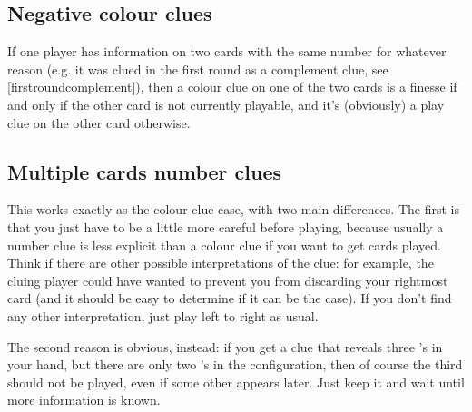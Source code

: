 \documentclass[a4paper]{article}
\theoremstyle{plain}
\theoremstyle{definition}
\begin{document}
\subsection{Negative colour clues}

If one player has information on two cards with the same number for whatever reason (e.g. it was clued  in the first round as a complement clue, see \ref{firstroundcomplement}), then a colour clue on one of the two cards is a finesse if and only if the other card is not currently playable, and it's (obviously) a play clue on the other card otherwise.

\subsection{Multiple cards number clues}

This works exactly as the colour clue case, with two main differences. The first is that you just have to be a little more careful before playing, because usually a number clue is less explicit than a colour clue if you want to get cards played. Think if there are other possible interpretations of the clue: for example, the cluing player could have wanted to prevent you from discarding your rightmost card (and it should be easy to determine if it can be the case). If you don't find any other interpretation, just play left to right as usual.

The second reason is obvious, instead: if you get a clue that reveals three 's in your hand, but there are only two 's in the configuration, then of course the third  should not be played, even if some other  appears later. Just keep it and wait until more information is known.


\end{document}
